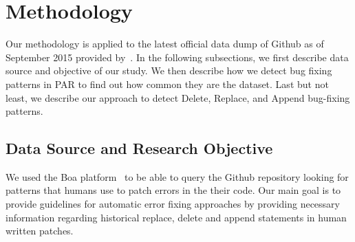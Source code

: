 \documentclass{sig-alternate-05-2015}
\begin{document}
\section{Methodology}
Our methodology is applied to the latest official data dump of Github as of
September 2015 provided by~\cite{dyer2013}. In the following subsections, we first
describe data source and objective of our study. We then describe how we detect
bug fixing patterns in PAR to find out how common they are the dataset. Last but
not least, we describe our approach to detect Delete, Replace, and Append
bug-fixing patterns.

\subsection{Data Source and Research Objective}
We used the Boa platform~\cite{dyer2013} to be able to query the Github repository
looking for patterns that humans use to patch errors in the their code. Our main
goal is to provide guidelines for automatic error fixing approaches by providing
necessary information regarding historical replace, delete and append statements
in human written patches. 
\end{document}
